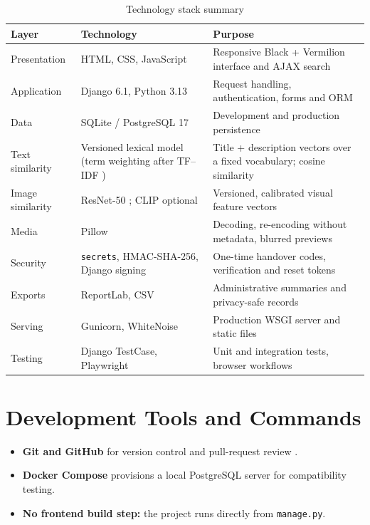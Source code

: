 \documentclass[12pt,a4paper,oneside]{report}
\newcommand{\code}[1]{\texttt{#1}}
\begin{document}
\begin{table}[H]
\centering\small
\caption{Technology stack summary}
\begin{tabularx}{\textwidth}{P{28mm}P{48mm}X}
\toprule
Layer & Technology & Purpose\\
\midrule
Presentation & HTML, CSS, JavaScript & Responsive Black + Vermilion interface and AJAX search\\
Application & Django 6.1, Python 3.13 & Request handling, authentication, forms and ORM\\
Data & SQLite / PostgreSQL 17 & Development and production persistence\\
Text similarity & Versioned lexical model (term weighting after TF--IDF \cite{tfidf}) & Title + description vectors over a fixed vocabulary; cosine similarity\\
Image similarity & ResNet-50 \cite{resnet}; CLIP \cite{clip} optional & Versioned, calibrated visual feature vectors\\
Media & Pillow & Decoding, re-encoding without metadata, blurred previews\\
Security & \code{secrets}, HMAC-SHA-256, Django signing & One-time handover codes, verification and reset tokens\\
Exports & ReportLab, CSV & Administrative summaries and privacy-safe records\\
Serving & Gunicorn, WhiteNoise & Production WSGI server and static files\\
Testing & Django TestCase, Playwright & Unit and integration tests, browser workflows\\
\bottomrule
\end{tabularx}
\end{table}

\section{Development Tools and Commands}
\begin{itemize}
  \item \textbf{Git and GitHub} for version control and pull-request review \cite{lostlinkrepo}.
  \item \textbf{Docker Compose} provisions a local PostgreSQL server for compatibility testing.
  \item \textbf{No frontend build step:} the project runs directly from \code{manage.py}.
\end{itemize}
\end{document}
